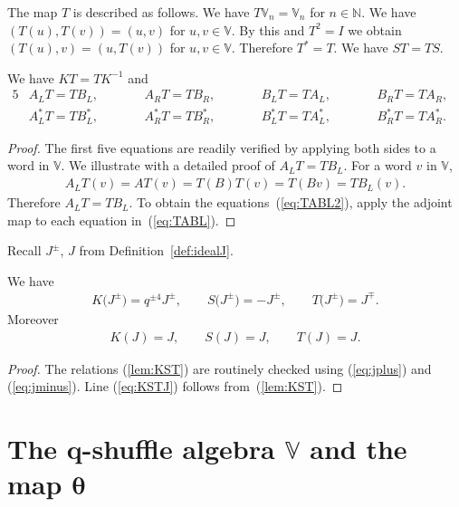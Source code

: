 The map $T$ is described as follows. We have $T\mathbb V_n=\mathbb V_n$ for $n \in \mathbb N$. We have
$(T(u), T(v))=(u,v)$ for $u,v \in \mathbb V$.
By this and $T^2=I$ we obtain
$(T(u), v)=(u,T(v))$ for $u,v \in \mathbb V$.
Therefore
$T^*=T$. We have
$ST=TS$.
\begin{Lemma}
\label{lem:Tact}
We have $KT=TK^{-1}$ and
\begin{alignat}{5}
& A_L T = T B_L, \qquad &&
A_R T = T B_R, \qquad &&
B_L T = T A_L, \qquad &&
B_R T = T A_R, & \label{eq:TABL}\\
& A^*_L T = T B^*_L, \qquad &&
A^*_R T = T B^*_R, \qquad &&
B^*_L T = T A^*_L, \qquad &&
B^*_R T = T A^*_R. &\label{eq:TABL2}
\end{alignat}
\end{Lemma}
\begin{proof} The first five equations are readily verified by applying both sides to a word in $\mathbb V$.
We illustrate with a detailed proof of $A_L T = T B_L$.
For a word $v$ in $\mathbb V$,
\begin{gather*}
A_L T(v) = A T(v) = T(B)T(v) = T(Bv) = T B_L(v).
\end{gather*}
Therefore $A_L T = T B_L$. To obtain the equations~(\ref{eq:TABL2}), apply the adjoint map to each equation in~(\ref{eq:TABL}).
\end{proof}

Recall $J^{\pm}$, $J$ from Definition~\ref{def:idealJ}.

\begin{Lemma}\label{lem:Jinv}We have
\begin{gather}\label{lem:KST}
K\big(J^{\pm }\big) = q^{\pm 4} J^{\pm },
\qquad
S\big(J^{\pm }\big) = -J^{\pm },
\qquad
T\big(J^{\pm }\big) = J^{\mp }.
\end{gather}
Moreover
\begin{gather}\label{eq:KSTJ}
K (J) = J, \qquad S (J) = J, \qquad T (J) = J.
\end{gather}
\end{Lemma}
\begin{proof}  The relations
(\ref{lem:KST}) are routinely checked using
(\ref{eq:jplus}) and
(\ref{eq:jminus}).
Line (\ref{eq:KSTJ}) follows from~(\ref{lem:KST}).
\end{proof}

\section[The $q$-shuffle algebra $\mathbb V$ and the map $\theta$]{The $\boldsymbol{q}$-shuffle algebra $\boldsymbol{\mathbb V}$ and the map $\boldsymbol{\theta}$}\label{section6}

